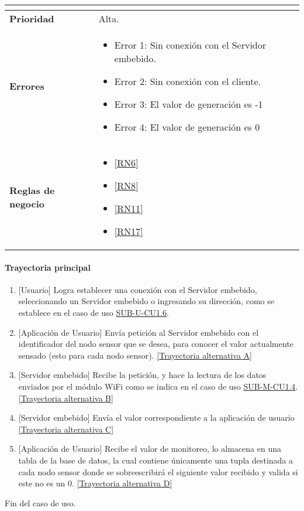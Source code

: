 \begin{longtable}{|J{5cm}|J{10.3cm}|}
\begin{itemize}
		\end{itemize} \\ \hline 
	\textbf{Prioridad} & 
		Alta. \\ \hline
	\textbf{Errores} & 
		\begin{itemize}
		    \item \label{CUU1.8:Error1} Error 1: Sin conexión con el Servidor embebido.
		    \item \label{CUU1.8:Error2} Error 2: Sin conexión con el cliente.
		    \item \label{CUU1.8:Error3} Error 3: El valor de generación es -1
		    \item \label{CUU1.8:Error4} Error 4: El valor de generación es 0
		\end{itemize} \\ \hline
	\textbf{Reglas de negocio} & 
		\begin{itemize}
		    \item \ref{RN6}
			\item \ref{RN8}
			\item \ref{RN11}
			\item \ref{RN17}
		\end{itemize} \\ \hline
\end{longtable}

\paragraph{Trayectoria principal}\label{SUB-U-CU1.8:TP}
    \label{SUB-U-CU1.8:TP}
	\begin{enumerate}
	    \item {[Usuario]} Logra establecer una conexión con el Servidor embebido, seleccionando un Servidor embebido o ingresando su dirección, como se establece en el caso de uso \hyperref[SUB-U-CU1.6]{SUB-U-CU1.6}.
	    \item {[Aplicación de Usuario]} Envía petición al Servidor embebido con el identificador del nodo sensor que se desea, para conocer el valor actualmente sensado (esto para cada nodo sensor). \hyperref[SUB-U-CU1.8:TA]{[Trayectoria alternativa A]} 
	    \item {[Servidor embebido]} Recibe la petición, y hace la lectura de los datos enviados por el módulo WiFi como se indica en el caso de uso  \hyperref[SUB-M-CU1.4]{SUB-M-CU1.4}. \hyperref[SUB-U-CU1.8:TB]{[Trayectoria alternativa B]}
	    \item {[Servidor embebido]} Envía el valor correspondiente a la aplicación de usuario \hyperref[SUB-U-CU1.8:TC]{[Trayectoria alternativa C]} 
	    \item {[Aplicación de Usuario]} Recibe el valor de monitoreo, lo almacena en una tabla de la base de datos, la cual contiene únicamente una tupla destinada a cada nodo sensor donde se sobreescribirá el siguiente valor recibido y valida si este no es un 0. \hyperref[SUB-U-CU1.8:TD]{[Trayectoria alternativa D]}
	\end{enumerate}
	Fin del caso de uso.


